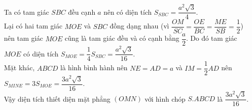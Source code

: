 \begin{ex}
{\begin{enumerate}
			      Ta có tam giác $SBC$ đều cạnh $a$ nên có diện tích $S_{SBC}=\dfrac{a^2\sqrt{3}}{4}$.\\
			      Lại có hai tam giác $MOE$ và $SBC$ đồng dạng nhau (vì $\dfrac{OM}{SC}=\dfrac{OE}{BC}=\dfrac{ME}{SB}=\dfrac{1}{2}$) nên tam giác $MOE$ cũng là tam giác đều và có cạnh bằng $\dfrac{a}{2}$. Do đó tam giác $MOE$ có diện tích $S_{MOE}=\dfrac{1}{4}S_{SBC}=\dfrac{a^2\sqrt{3}}{16}$.\\
			      Mặt khác, $ABCD$ là hình bình hành nên $NE=AD=a$ và $IM= \dfrac{1}{2}AD$ nên $S_{MINE}=3S_{MOE}=\dfrac{3a^2\sqrt{3}}{16}$.\\
			      Vậy diện tích thiết diện mặt phẳng $(OMN)$ với hình chóp $S.ABCD$ là $\dfrac{3a^2\sqrt{3}}{16}$.
		\end{enumerate}
	}
\end{ex}
